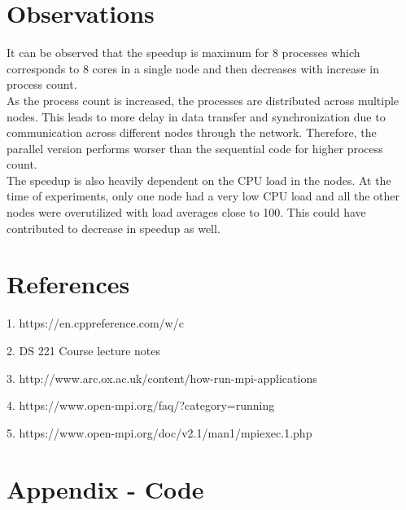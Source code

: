 \documentclass[11pt,a4paper,oneside]{article}
\begin{document}
    \section{Observations}
    It can be observed that the speedup is maximum for 8 processes which corresponds to 8 cores in a single node and then decreases with increase in process count. \\
    \newline
    As the process count is increased, the processes are distributed across multiple nodes. This leads to more delay in data transfer and synchronization due to communication across different nodes through the network. Therefore, the parallel version performs worser than the sequential code for higher process count. \\
    \newline
    The speedup is also heavily dependent on the CPU load in the nodes. At the time of experiments, only one node had a very low CPU load and all the other nodes were overutilized with load averages close to 100. This could have contributed to decrease in speedup as well. \\
       
    
    \section{References}
    \begin{list}{}{}
    	\item 1. https://en.cppreference.com/w/c
    	\item 2. DS 221 Course lecture notes
    	\item 3. http://www.arc.ox.ac.uk/content/how-run-mpi-applications
    	\item 4. https://www.open-mpi.org/faq/?category=running
    	\item 5. https://www.open-mpi.org/doc/v2.1/man1/mpiexec.1.php
    \end{list}

    \section{Appendix - Code} 
    
\end{document}
